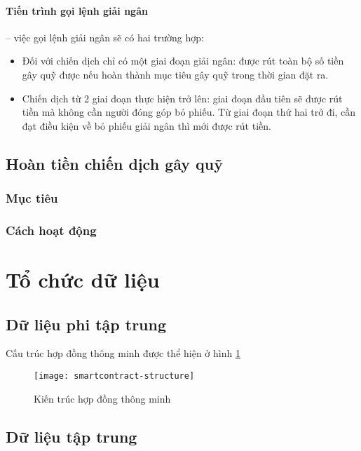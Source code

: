 \documentclass[../main-report.tex]{subfiles}
\begin{document}
\paragraph{Tiến trình gọi lệnh giải ngân} -- việc gọi lệnh giải ngân sẽ có hai trường hợp:

\begin{itemize}
\item Đối với chiến dịch chỉ có một giai đoạn giải ngân: được rút toàn bộ số tiền gây quỹ được nếu hoàn thành mục tiêu gây quỹ trong thời gian đặt ra.
\item Chiến dịch từ 2 giai đoạn thực hiện trở lên: giai đoạn đầu tiên sẽ được rút tiền mà không cần người đóng góp bỏ phiếu. Từ giai đoạn thứ hai trở đi, cần đạt điều kiện về bỏ phiếu giải ngân thì mới được rút tiền.
\end{itemize}

\subsection{Hoàn tiền chiến dịch gây quỹ}
\subsubsection{Mục tiêu}

\subsubsection{Cách hoạt động}

\section{Tổ chức dữ liệu}
\subsection{Dữ liệu phi tập trung}
Cấu trúc hợp đồng thông minh được thể hiện ở hình \ref{fig:smartcontract-structure}

\begin{figure}[ht!]
\begin{center}
\label{fig:smartcontract-structure}
\texttt{[image: smartcontract-structure]}
\caption{Kiến trúc hợp đồng thông minh}
\end{center}
\end{figure}

\subsection{Dữ liệu tập trung}
\end{document}
